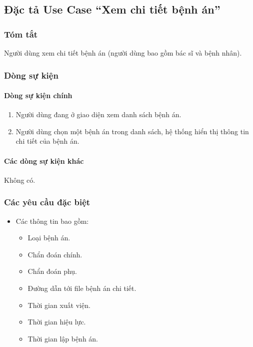 \subsection{Đặc tả Use Case ``Xem chi tiết bệnh án''}

\subsubsection{Tóm tắt}
Người dùng xem chi tiết bệnh án (người dùng bao gồm bác sĩ và bệnh nhân).

\subsubsection{Dòng sự kiện}
\paragraph{\textbf{Dòng sự kiện chính}}
\begin{enumerate}
  \item Người dùng đang ở giao diện xem danh sách bệnh án.
  \item Người dùng chọn một bệnh án trong danh sách, hệ thống hiển thị thông tin chi tiết của bệnh án.
\end{enumerate}

\paragraph{\textbf{Các dòng sự kiện khác}}
Không có.

\subsubsection{Các yêu cầu đặc biệt}
\begin{itemize}
  \item Các thông tin bao gồm:
    \begin{itemize}
      \item Loại bệnh án.
      \item Chẩn đoán chính.
      \item Chẩn đoán phụ.
      \item Đường dẫn tới file bệnh án chi tiết.
      \item Thời gian xuất viện.
      \item Thời gian hiệu lực.
      \item Thời gian lập bệnh án.
    \end{itemize}
\end{itemize}

